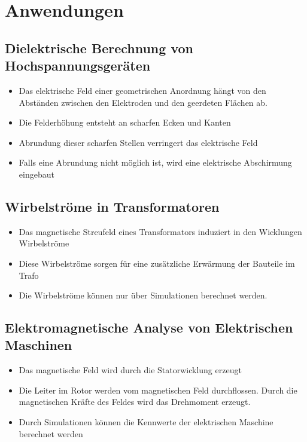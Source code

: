 \section{Anwendungen}
\subsection{Dielektrische Berechnung von Hochspannungsgeräten}
\begin{itemize}
	\item Das elektrische Feld einer geometrischen Anordnung hängt von den Abständen zwischen den Elektroden und den geerdeten Flächen ab.
	\item Die Felderhöhung entsteht an scharfen Ecken und Kanten
	\item Abrundung dieser scharfen Stellen verringert das elektrische Feld
	\item Falls eine Abrundung nicht möglich ist, wird eine elektrische Abschirmung eingebaut
\end{itemize}
\subsection{Wirbelströme in Transformatoren}
\begin{itemize}
	\item Das magnetische Streufeld eines Transformators induziert in den Wicklungen Wirbelströme
	\item Diese Wirbelströme sorgen für eine zusätzliche Erwärmung der Bauteile im Trafo
	\item Die Wirbelströme können nur über Simulationen berechnet werden. 
\end{itemize}
\subsection{Elektromagnetische Analyse von Elektrischen Maschinen}
\begin{itemize}
	\item Das magnetische Feld wird durch die Statorwicklung erzeugt
	\item Die Leiter im Rotor werden vom magnetischen Feld durchflossen. Durch die magnetischen Kräfte des Feldes wird das Drehmoment erzeugt. 
	\item Durch Simulationen können die Kennwerte der elektrischen Maschine berechnet werden
\end{itemize}
